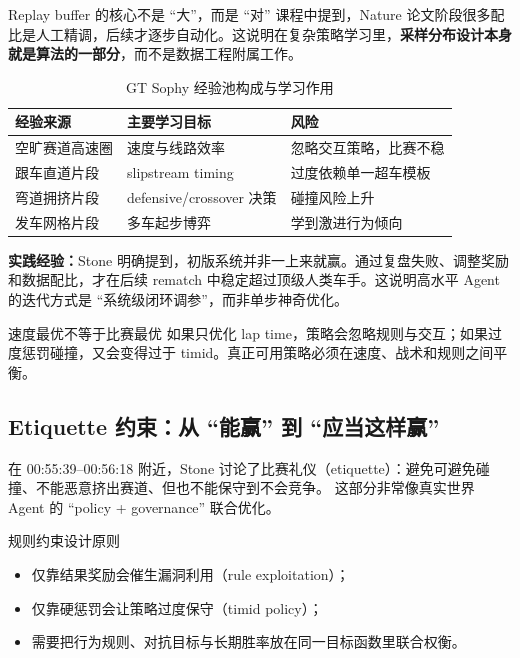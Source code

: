 \begin{knowledgebox}{Replay buffer 的核心不是 ``大''，而是 ``对''}
课程中提到，Nature 论文阶段很多配比是人工精调，后续才逐步自动化。这说明在复杂策略学习里，\textbf{采样分布设计本身就是算法的一部分}，而不是数据工程附属工作。
\end{knowledgebox}

\begin{table}[H]
\centering
\begin{tabular}{p{2.8cm}p{4.6cm}p{4.2cm}}
\toprule
\textbf{经验来源} & \textbf{主要学习目标} & \textbf{风险} \\
\midrule
空旷赛道高速圈 & 速度与线路效率 & 忽略交互策略，比赛不稳 \\
跟车直道片段 & slipstream timing & 过度依赖单一超车模板 \\
弯道拥挤片段 & defensive/crossover 决策 & 碰撞风险上升 \\
发车网格片段 & 多车起步博弈 & 学到激进行为倾向 \\
\bottomrule
\end{tabular}
\caption{GT Sophy 经验池构成与学习作用}
\end{table}

\textbf{实践经验：}Stone 明确提到，初版系统并非一上来就赢。通过复盘失败、调整奖励和数据配比，才在后续 rematch 中稳定超过顶级人类车手。这说明高水平 Agent 的迭代方式是 ``系统级闭环调参''，而非单步神奇优化。

\begin{warningbox}{速度最优不等于比赛最优}
如果只优化 lap time，策略会忽略规则与交互；如果过度惩罚碰撞，又会变得过于 timid。真正可用策略必须在速度、战术和规则之间平衡。
\end{warningbox}

\subsection{Etiquette 约束：从 ``能赢'' 到 ``应当这样赢''}
在 00:55:39--00:56:18 附近，Stone 讨论了比赛礼仪（etiquette）：避免可避免碰撞、不能恶意挤出赛道、但也不能保守到不会竞争。
这部分非常像真实世界 Agent 的 ``policy + governance'' 联合优化。

\begin{importantbox}{规则约束设计原则}
\begin{itemize}
    \item 仅靠结果奖励会催生漏洞利用（rule exploitation）；
    \item 仅靠硬惩罚会让策略过度保守（timid policy）；
    \item 需要把行为规则、对抗目标与长期胜率放在同一目标函数里联合权衡。
\end{itemize}
\end{importantbox}

